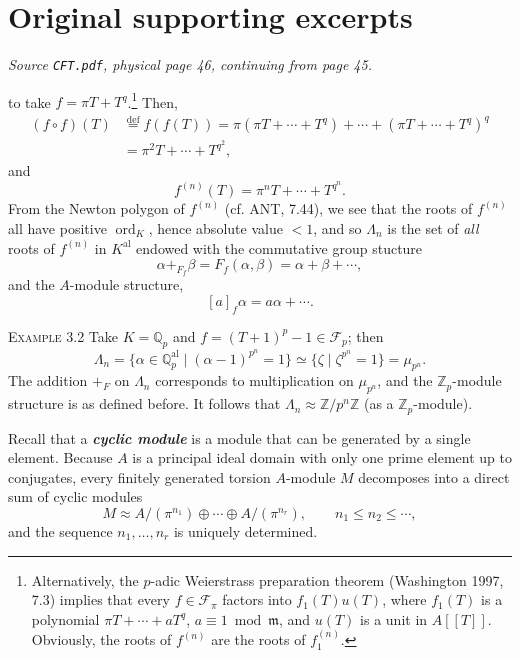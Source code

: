 \documentclass[11pt,a4paper]{article}
\begin{document}
\section*{Original supporting excerpts}
\noindent\emph{Source \texttt{CFT.pdf}, physical page 46, continuing from page 45.}\par\smallskip
\begingroup
\setlength{\abovedisplayskip}{8pt plus 2pt minus 2pt}
\setlength{\belowdisplayskip}{8pt plus 2pt minus 2pt}
\noindent to take $f=\pi T+T^q$.\footnote[2]{Alternatively, the $p$-adic
Weierstrass preparation theorem (Washington 1997, 7.3) implies that every
$f\in\mathcal F_\pi$ factors into $f_1(T)u(T)$, where $f_1(T)$ is a
polynomial $\pi T+\cdots+aT^q$, $a\equiv 1\bmod\mathfrak m$, and $u(T)$
is a unit in $A[[T]]$. Obviously, the roots of $f^{(n)}$ are the roots of
$f_1^{(n)}$.} Then,
\[
\begin{aligned}
(f\circ f)(T)&\overset{\mathrm{def}}{=}f(f(T))
 =\pi(\pi T+\cdots+T^q)+\cdots+(\pi T+\cdots+T^q)^q\\
 &=\pi^2T+\cdots+T^{q^2},
\end{aligned}
\]
and
\[
f^{(n)}(T)=\pi^nT+\cdots+T^{q^n}.
\]
From the Newton polygon of $f^{(n)}$ (cf. ANT, 7.44), we see that the
roots of $f^{(n)}$ all have positive $\operatorname{ord}_K$, hence absolute
value $<1$, and so $\Lambda_n$ is the set of \emph{all} roots of $f^{(n)}$
in $K^{\mathrm{al}}$ endowed with the commutative group stucture
\[
\alpha+_{F_f}\beta=F_f(\alpha,\beta)=\alpha+\beta+\cdots,
\]
and the $A$-module structure,
\[
[a]_f\alpha=a\alpha+\cdots.
\]

\noindent\textsc{Example 3.2} Take $K=\mathbb Q_p$ and
$f=(T+1)^p-1\in\mathcal F_p$; then
\[
\Lambda_n=\{\alpha\in\mathbb Q_p^{\mathrm{al}}\mid(\alpha-1)^{p^n}=1\}
 \simeq\{\zeta\mid\zeta^{p^n}=1\}=\mu_{p^n}.
\]
The addition $+_F$ on $\Lambda_n$ corresponds to multiplication on
$\mu_{p^n}$, and the $\mathbb Z_p$-module structure is as defined before.
It follows that $\Lambda_n\approx\mathbb Z/p^n\mathbb Z$ (as a
$\mathbb Z_p$-module).

Recall that a \emph{\textbf{cyclic module}} is a module that can be
generated by a single element. Because $A$ is a principal ideal domain
with only one prime element up to conjugates, every finitely generated
torsion $A$-module $M$ decomposes into a direct sum of cyclic modules
\[
M\approx A/(\pi^{n_1})\oplus\cdots\oplus A/(\pi^{n_r}),
\qquad n_1\leq n_2\leq\cdots,
\]
and the sequence $n_1,\ldots,n_r$ is uniquely determined.
\end{document}
